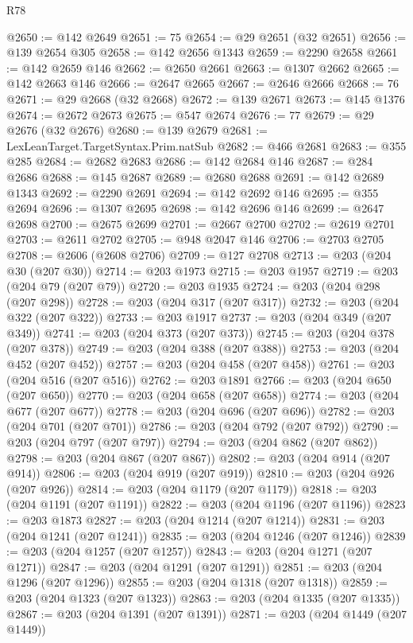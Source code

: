 \begin{lexlean}{R78}
\begin{coremodule}
@2650 := @142 @2649
@2651 := 75
@2654 := @29 @2651 (@32 @2651)
@2656 := @139 @2654 @305
@2658 := @142 @2656 @1343
@2659 := @2290 @2658
@2661 := @142 @2659 @146
@2662 := @2650 @2661
@2663 := @1307 @2662
@2665 := @142 @2663 @146
@2666 := @2647 @2665
@2667 := @2646 @2666
@2668 := 76
@2671 := @29 @2668 (@32 @2668)
@2672 := @139 @2671
@2673 := @145 @1376
@2674 := @2672 @2673
@2675 := @547 @2674
@2676 := 77
@2679 := @29 @2676 (@32 @2676)
@2680 := @139 @2679
@2681 := LexLeanTarget.TargetSyntax.Prim.natSub
@2682 := @466 @2681
@2683 := @355 @285
@2684 := @2682 @2683
@2686 := @142 @2684 @146
@2687 := @284 @2686
@2688 := @145 @2687
@2689 := @2680 @2688
@2691 := @142 @2689 @1343
@2692 := @2290 @2691
@2694 := @142 @2692 @146
@2695 := @355 @2694
@2696 := @1307 @2695
@2698 := @142 @2696 @146
@2699 := @2647 @2698
@2700 := @2675 @2699
@2701 := @2667 @2700
@2702 := @2619 @2701
@2703 := @2611 @2702
@2705 := @948 @2047 @146
@2706 := @2703 @2705
@2708 := @2606 (@2608 @2706)
@2709 := @127 @2708
@2713 := @203 (@204 @30 (@207 @30))
@2714 := @203 @1973
@2715 := @203 @1957
@2719 := @203 (@204 @79 (@207 @79))
@2720 := @203 @1935
@2724 := @203 (@204 @298 (@207 @298))
@2728 := @203 (@204 @317 (@207 @317))
@2732 := @203 (@204 @322 (@207 @322))
@2733 := @203 @1917
@2737 := @203 (@204 @349 (@207 @349))
@2741 := @203 (@204 @373 (@207 @373))
@2745 := @203 (@204 @378 (@207 @378))
@2749 := @203 (@204 @388 (@207 @388))
@2753 := @203 (@204 @452 (@207 @452))
@2757 := @203 (@204 @458 (@207 @458))
@2761 := @203 (@204 @516 (@207 @516))
@2762 := @203 @1891
@2766 := @203 (@204 @650 (@207 @650))
@2770 := @203 (@204 @658 (@207 @658))
@2774 := @203 (@204 @677 (@207 @677))
@2778 := @203 (@204 @696 (@207 @696))
@2782 := @203 (@204 @701 (@207 @701))
@2786 := @203 (@204 @792 (@207 @792))
@2790 := @203 (@204 @797 (@207 @797))
@2794 := @203 (@204 @862 (@207 @862))
@2798 := @203 (@204 @867 (@207 @867))
@2802 := @203 (@204 @914 (@207 @914))
@2806 := @203 (@204 @919 (@207 @919))
@2810 := @203 (@204 @926 (@207 @926))
@2814 := @203 (@204 @1179 (@207 @1179))
@2818 := @203 (@204 @1191 (@207 @1191))
@2822 := @203 (@204 @1196 (@207 @1196))
@2823 := @203 @1873
@2827 := @203 (@204 @1214 (@207 @1214))
@2831 := @203 (@204 @1241 (@207 @1241))
@2835 := @203 (@204 @1246 (@207 @1246))
@2839 := @203 (@204 @1257 (@207 @1257))
@2843 := @203 (@204 @1271 (@207 @1271))
@2847 := @203 (@204 @1291 (@207 @1291))
@2851 := @203 (@204 @1296 (@207 @1296))
@2855 := @203 (@204 @1318 (@207 @1318))
@2859 := @203 (@204 @1323 (@207 @1323))
@2863 := @203 (@204 @1335 (@207 @1335))
@2867 := @203 (@204 @1391 (@207 @1391))
@2871 := @203 (@204 @1449 (@207 @1449))

\end{coremodule}
\end{lexlean}
